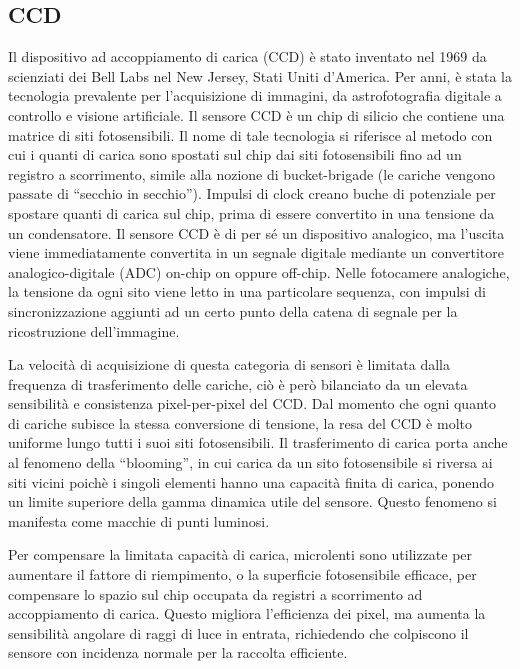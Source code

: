 \subsection{CCD} 
Il dispositivo ad accoppiamento di carica (CCD) è stato
inventato nel 1969 da scienziati dei Bell Labs nel New Jersey, Stati Uniti
d'America. Per anni, è stata la tecnologia prevalente per l'acquisizione di
immagini, da astrofotografia digitale a controllo e visione artificiale. Il
sensore CCD è un chip di silicio che contiene una matrice di siti
fotosensibili. Il nome di tale tecnologia si riferisce al metodo con cui i
quanti di carica sono spostati sul chip dai siti fotosensibili fino ad un
registro a scorrimento, simile alla nozione di bucket-brigade (le cariche
vengono passate di ``secchio in secchio''). Impulsi di clock creano buche di
potenziale per spostare quanti di carica sul chip, prima di essere convertito
in una tensione da un condensatore. Il sensore CCD è di per sé un dispositivo
analogico, ma l'uscita viene immediatamente convertita in un segnale digitale
mediante un convertitore analogico-digitale (ADC) on-chip on oppure off-chip.
Nelle fotocamere analogiche, la tensione da ogni sito viene letto in una
particolare sequenza, con impulsi di sincronizzazione aggiunti ad un certo
punto della catena di segnale per la ricostruzione dell'immagine.

La velocità di acquisizione di questa categoria di sensori è limitata dalla
frequenza di trasferimento delle cariche, ciò è però bilanciato da un elevata
sensibilità e consistenza pixel-per-pixel del CCD. Dal momento che ogni quanto
di cariche subisce la stessa conversione di tensione, la resa del CCD è molto
uniforme lungo tutti i suoi siti fotosensibili. Il trasferimento di carica
porta anche al fenomeno della ``blooming'', in cui carica da un sito
fotosensibile si riversa ai siti vicini poichè i singoli elementi hanno una
capacità finita di carica, ponendo un limite superiore della gamma dinamica
utile del sensore. Questo fenomeno si manifesta come macchie di punti
luminosi.

Per compensare la limitata capacità di carica, microlenti sono utilizzate per
aumentare il fattore di riempimento, o la superficie fotosensibile efficace,
per compensare lo spazio sul chip occupata da registri a scorrimento ad
accoppiamento di carica. Questo migliora l'efficienza dei pixel, ma aumenta la
sensibilità angolare di raggi di luce in entrata, richiedendo che colpiscono
il sensore con incidenza normale per la raccolta efficiente.



